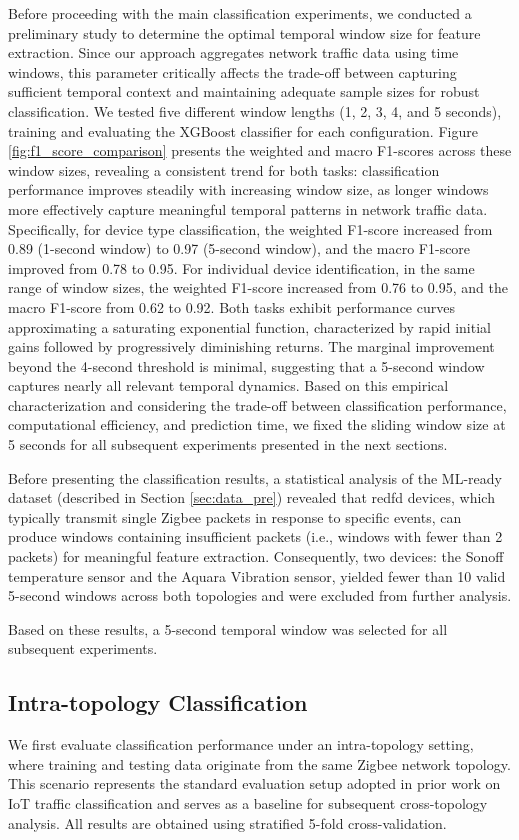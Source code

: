 Before proceeding with the main classification experiments, we conducted a preliminary study to determine the optimal temporal window size for feature extraction. Since our approach aggregates network traffic data using time windows, this parameter critically affects the trade-off between capturing sufficient temporal context and maintaining adequate sample sizes for robust classification.
We tested five different window lengths (1, 2, 3, 4, and 5 seconds), training and evaluating the XGBoost classifier for each configuration. Figure \ref{fig:f1_score_comparison} presents the weighted and macro F1-scores across these window sizes, revealing a consistent trend for both tasks: classification performance improves steadily with increasing window size, as longer windows more effectively capture meaningful temporal patterns in network traffic data.
Specifically, for device type classification, the weighted F1-score increased from 0.89 (1-second window) to 0.97 (5-second window), and the macro F1-score improved from 0.78 to 0.95. For individual device identification, in the same range of window sizes, the weighted F1-score increased from 0.76 to 0.95, and the macro F1-score from 0.62 to 0.92.
Both tasks exhibit performance curves approximating a saturating exponential function, characterized by rapid initial gains followed by progressively diminishing returns. The marginal improvement beyond the 4-second threshold is minimal, suggesting that a 5-second window captures nearly all relevant temporal dynamics. Based on this empirical characterization and considering the trade-off between classification performance, computational efficiency, and prediction time, we fixed the sliding window size at 5 seconds for all subsequent experiments presented in the next sections.

Before presenting the classification results, a statistical analysis of the ML-ready dataset (described in Section \ref{sec:data_pre}) revealed that \gls*{redfd} devices, which typically transmit single Zigbee packets in response to specific events, can produce windows containing insufficient packets (i.e., windows with fewer than 2 packets) for meaningful feature extraction. Consequently, two devices: the Sonoff temperature sensor and the Aquara Vibration sensor, yielded fewer than 10 valid 5-second windows across both topologies and were excluded from further analysis.

Based on these results, a 5-second temporal window was selected for all subsequent experiments.

\subsection{Intra-topology Classification}
We first evaluate classification performance under an intra-topology setting, where training and testing data originate from the same Zigbee network topology. This scenario represents the standard evaluation setup adopted in prior work on IoT traffic classification and serves as a baseline for subsequent cross-topology analysis. All results are obtained using stratified 5-fold cross-validation.

